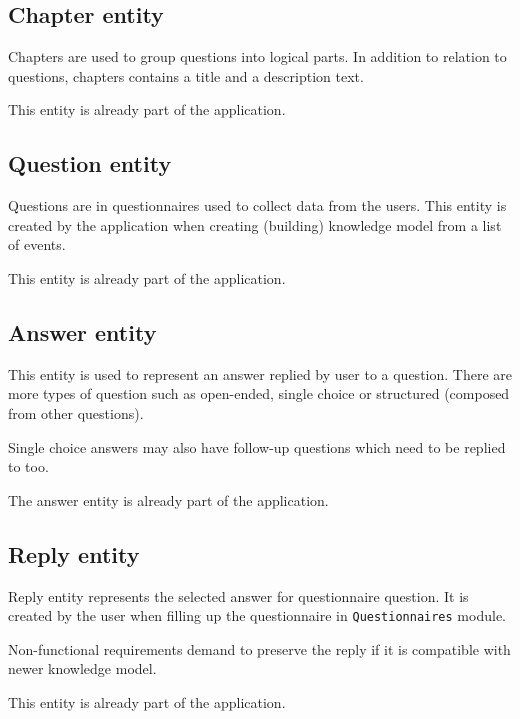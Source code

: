 \subsection{Chapter entity}

Chapters are used to group questions into logical parts.
In addition to relation to questions, chapters contains a title and a description text.

This entity is already part of the application.

\subsection{Question entity}

Questions are in questionnaires used to collect data from the users.
This entity is created by the application when creating (building) knowledge model from a list of events.

This entity is already part of the application.

\subsection{Answer entity}

This entity is used to represent an answer replied by user to a question.
There are more types of question such as open-ended, single choice or structured (composed from other questions).

Single choice answers may also have follow-up questions which need to be replied to too.

The answer entity is already part of the application.

\subsection{Reply entity}

Reply entity represents the selected answer for questionnaire question.
It is created by the user when filling up the questionnaire in \texttt{Questionnaires} module.

Non-functional requirements demand to preserve the reply if it is compatible with newer knowledge model.

This entity is already part of the application.
